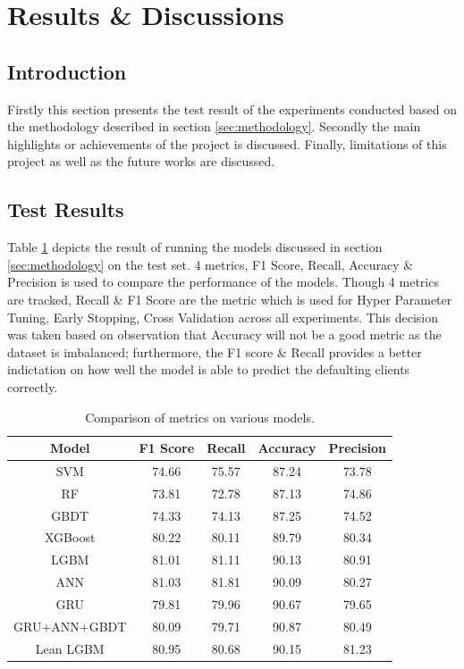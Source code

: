 \documentclass[twoside,11pt,a4paper]{article}
\begin{document}
\section{Results \& Discussions}\label{sec:results_discussions}

\subsection{Introduction}
Firstly this section presents the test result of the experiments conducted based on the methodology described in section \ref{sec:methodology}. Secondly the main highlights or achievements of the project is discussed. Finally, limitations of this project as well as the future works are discussed.

\subsection{Test Results}
Table \ref{table:results} depicts the result of running the models discussed in section \ref{sec:methodology} on the test set. 4 metrics, F1 Score, Recall, Accuracy \& Precision is used to compare the performance of the models. Though 4 metrics are tracked, Recall \& F1 Score are the metric which is used for Hyper Parameter Tuning, Early Stopping, Cross Validation across all experiments. This decision was taken based on observation that Accuracy will not be a good metric as the dataset is imbalanced; furthermore, the F1 score \& Recall provides a better indictation on how well the model is able to predict the defaulting clients correctly.

\begin{table}[h]
	\begin{center}
		\begin{tabular}{|| c | c | c | c | c ||} 
			\hline
			Model & F1 Score & Recall & Accuracy & Precision \\ [0.5ex] 
			\hline\hline
			SVM	 & 74.66	& 75.57	& 87.24	& \cellcolor[HTML]{ff6666} 73.78 \\
			\hline
			RF	 & \cellcolor[HTML]{ff6666} 73.81	& \cellcolor[HTML]{ff6666} 72.78	& \cellcolor[HTML]{ff6666} 87.13	& 74.86 \\
			\hline
			GBDT	 & 74.33	& 74.13	& 87.25	& 74.52 \\
			\hline
			XGBoost	 & 80.22	& 80.11	& 89.79	& 80.34 \\
			\hline
			LGBM	 & 81.01	& 81.11	& 90.13	& 80.91 \\
			\hline
			ANN	 & \cellcolor[HTML]{339933} 81.03	&  \cellcolor[HTML]{339933} 81.81	& 90.09	& 80.27 \\
			\hline
			GRU	 & 79.81	& 79.96	& 90.67	& 79.65 \\
			\hline
			GRU+ANN+GBDT	 & 80.09	& 79.71	& \cellcolor[HTML]{339933} 90.87	& 80.49 \\
			\hline
			Lean LGBM	 & 80.95	& 80.68	& 90.15	& \cellcolor[HTML]{339933} 81.23 \\
			\hline
		\end{tabular}
		\caption{Comparison of metrics on various models.}
		\label{table:results}
	\end{center}
\end{table}
\end{document}
